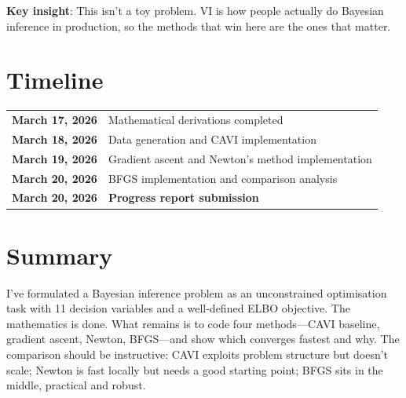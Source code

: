 \documentclass[11pt]{article}
\begin{document}
\textbf{Key insight}: This isn't a toy problem. VI is how people actually do Bayesian inference in production, so the methods that win here are the ones that matter.

\section{Timeline}

\begin{tabular}{ll}
\textbf{March 17, 2026} & Mathematical derivations completed \\
\textbf{March 18, 2026} & Data generation and CAVI implementation \\
\textbf{March 19, 2026} & Gradient ascent and Newton's method implementation \\
\textbf{March 20, 2026} & BFGS implementation and comparison analysis \\
\textbf{March 20, 2026} & \textbf{Progress report submission} \\
\end{tabular}

\section{Summary}

I've formulated a Bayesian inference problem as an unconstrained optimisation task with 11 decision variables and a well-defined ELBO objective. The mathematics is done. What remains is to code four methods—CAVI baseline, gradient ascent, Newton, BFGS—and show which converges fastest and why. The comparison should be instructive: CAVI exploits problem structure but doesn't scale; Newton is fast locally but needs a good starting point; BFGS sits in the middle, practical and robust.
\end{document}
